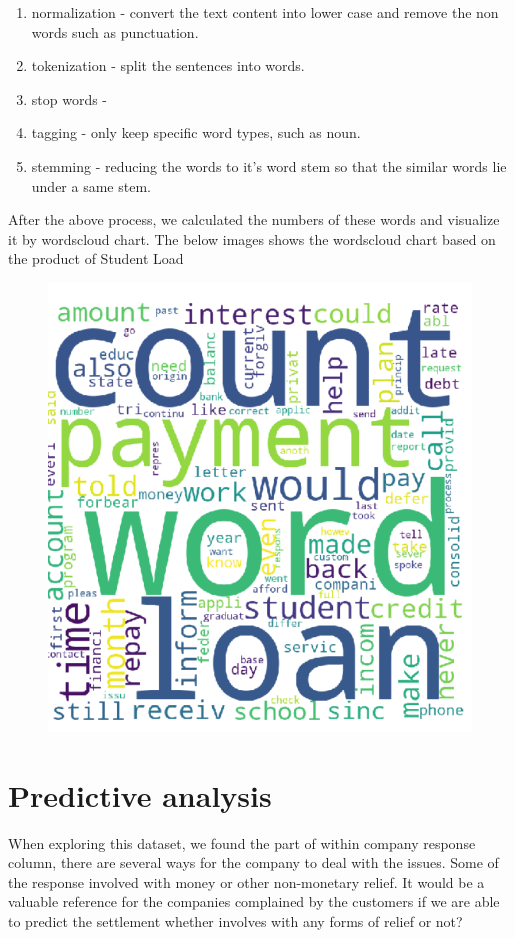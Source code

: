 \documentclass[conference]{IEEEtran}
\begin{document}
\begin{itemize}
\begin{enumerate}
\item normalization - convert the text content into lower case and remove the non words such as punctuation.
\item tokenization - split the sentences into words.
\item stop words -  
\item tagging - only keep specific word types, such as noun.
\item stemming - reducing the words to it's word stem so that the similar words lie under a same stem.
\end{enumerate}

After the above process, we calculated the numbers of these words and visualize it  by wordscloud chart. The below images shows the wordscloud chart based on the product of Student Load

	\begin{figure}[h]
		\centering
		\includegraphics[width=.8\linewidth]{img/word_cloud_student.png}
	\end{figure} 

\end{itemize}

\section{Predictive analysis }
When exploring this dataset, we found the part of within company response column, there are several ways for the company to deal with the issues. Some of the response involved with money or other non-monetary relief. It would be a valuable reference for the companies complained by the customers if we are able to predict the settlement whether involves with any forms of relief or not? 
\end{document}
